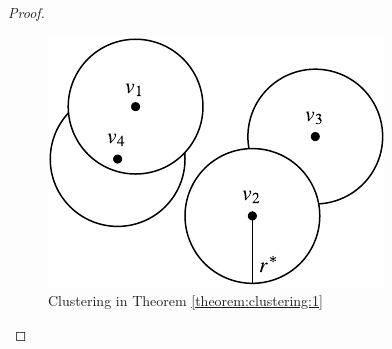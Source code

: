 {\color{red}
\begin{proof}
\begin{figure}[ht]
\centering
\includegraphics{./img/rand-clustering.pdf}
\caption{Clustering in Theorem \ref{theorem:clustering:1}}
\label{fig:3}
\end{figure}


\end{proof}}
